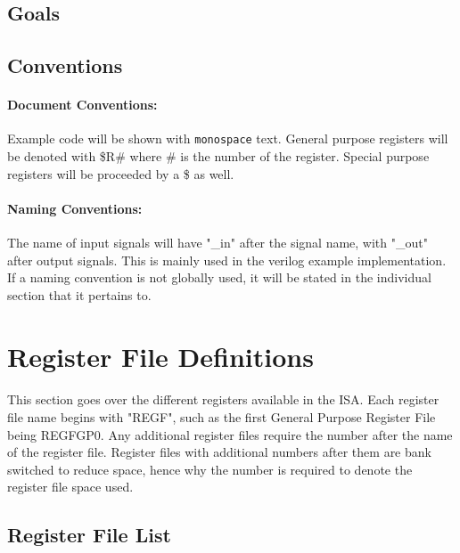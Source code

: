 \documentclass[letterpaper, 11pt]{article}
\begin{document}
\subsection{Goals}
\subsection{Conventions}
\paragraph{Document Conventions:}Example code will be shown with \texttt{monospace} text. General purpose registers will be denoted with
\$R\# where \# is the number of the register. Special purpose registers will be proceeded by a \$ as well.
\paragraph{Naming Conventions:}The name of input signals will have "\_in" after the signal name, with "\_out" after output signals.
This is mainly used in the verilog example implementation. If a naming convention is not globally used, it will be stated in the individual section that it pertains to. 


\section{Register File Definitions}
\paragraph{}This section goes over the different registers available in the ISA. Each register file name begins with 
"REGF", such as the first General Purpose Register File being REGFGP0. Any additional register files require the number after the
name of the register file. Register files with additional numbers after them are bank switched to reduce space, hence why the number is
required to denote the register file space used.
\subsection{Register File List}
\end{document}
